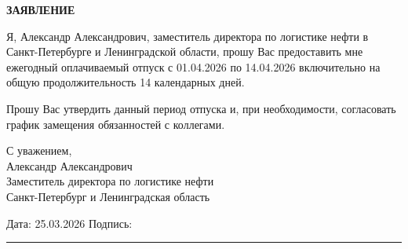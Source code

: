 \documentclass[12pt]{article}
\begin{document}
\begin{center}
\textbf{\LARGE ЗАЯВЛЕНИЕ}
\end{center}

\vspace{1cm}

Я, Александр Александрович, заместитель директора по логистике нефти в Санкт-Петербурге и Ленинградской области, прошу Вас предоставить мне ежегодный оплачиваемый отпуск с 01.04.2026 по 14.04.2026 включительно на общую продолжительность 14 календарных дней.

Прошу Вас утвердить данный период отпуска и, при необходимости, согласовать график замещения обязанностей с коллегами.

С уважением, \\
Александр Александрович \\
Заместитель директора по логистике нефти \\
Санкт-Петербург и Ленинградская область


\vfill

\noindent
Дата: 25.03.2026 \hfill Подпись: \rule{5cm}{0.4pt}
\end{document}
